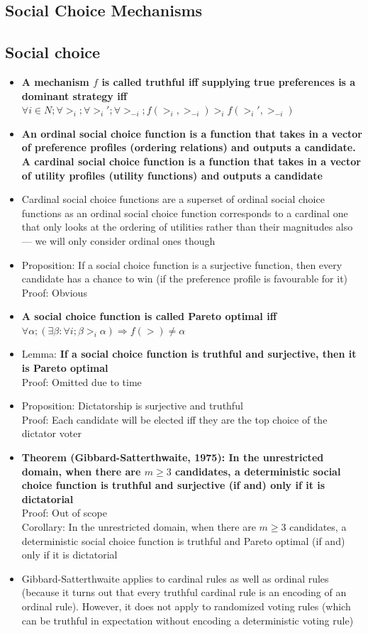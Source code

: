 \documentclass[20pt,a4paper,landscape]{extarticle}
\begin{document}
\begin{flushleft}
\section{Social Choice Mechanisms}
\subsection{Social choice}
\begin{itemize}
\item \textbf{A mechanism $f$ is called truthful iff supplying true preferences is a dominant strategy iff \boldmath$\forall i \in N; \forall >_i; \forall >_i'; \forall >_{-i}; f(>_i, >_{-i}) >_i f(>_i', >_{-i})$}
\item \textbf{An ordinal social choice function is a function that takes in a vector of preference profiles (ordering relations) and outputs a candidate. A cardinal social choice function is a function that takes in a vector of utility profiles (utility functions) and outputs a candidate}
\item Cardinal social choice functions are a superset of ordinal social choice functions as an ordinal social choice function corresponds to a cardinal one that only looks at the ordering of utilities rather than their magnitudes also --- we will only consider ordinal ones though
\item Proposition: If a social choice function is a surjective function, then every candidate has a chance to win (if the preference profile is favourable for it)\\
Proof: Obvious
\item \textbf{A social choice function is called Pareto optimal iff \boldmath$\forall \alpha; \left(\exists \beta: \forall i; \beta >_i \alpha\right) \Rightarrow f(>) \neq \alpha$}
\item Lemma: \textbf{If a social choice function is truthful and surjective, then it is Pareto optimal}\\
Proof: Omitted due to time
\item Proposition: Dictatorship is surjective and truthful\\
Proof: Each candidate will be elected iff they are the top choice of the dictator voter
\clearpage
\item \textbf{Theorem (Gibbard-Satterthwaite, 1975): In the unrestricted domain, when there are $m \geq 3$ candidates, a deterministic social choice function is truthful and surjective (if and) only if it is dictatorial}\\
Proof: Out of scope\\
Corollary: In the unrestricted domain, when there are $m \geq 3$ candidates, a deterministic social choice function is truthful and Pareto optimal (if and) only if it is dictatorial\\
\item Gibbard-Satterthwaite applies to cardinal rules as well as ordinal rules (because it turns out that every truthful cardinal rule is an encoding of an ordinal rule). However, it does not apply to randomized voting rules (which can be truthful in expectation without encoding a deterministic voting rule)
\end{itemize}
\clearpage

\end{flushleft}
\end{document}
